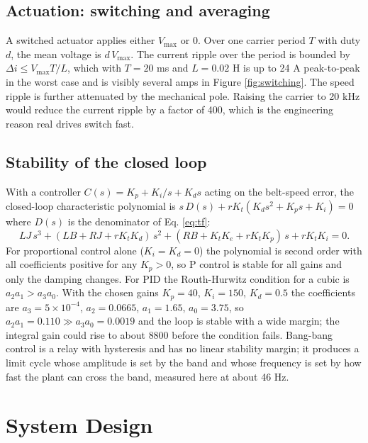 \documentclass[12pt,a4paper]{article}
\begin{document}
\subsection{Actuation: switching and averaging}

A switched actuator applies either $V_{\max}$ or 0. Over one carrier period $T$ with duty $d$, the mean voltage is $d\,V_{\max}$. The current ripple over the period is bounded by $\Delta i \le V_{\max} T / L$, which with $T = 20$ ms and $L = 0.02$ H is up to 24 A peak-to-peak in the worst case and is visibly several amps in Figure \ref{fig:switching}. The speed ripple is further attenuated by the mechanical pole. Raising the carrier to 20 kHz would reduce the current ripple by a factor of 400, which is the engineering reason real drives switch fast.

\subsection{Stability of the closed loop}

With a controller $C(s) = K_p + K_i/s + K_d s$ acting on the belt-speed error, the closed-loop characteristic polynomial is $s\,D(s) + r K_t (K_d s^2 + K_p s + K_i) = 0$ where $D(s)$ is the denominator of Eq. \ref{eq:tf}:
\begin{equation}
L J\,s^3 + (L B + R J + r K_t K_d)\,s^2 + (R B + K_t K_e + r K_t K_p)\,s + r K_t K_i = 0.
\label{eq:char}
\end{equation}
For proportional control alone ($K_i = K_d = 0$) the polynomial is second order with all coefficients positive for any $K_p > 0$, so P control is stable for all gains and only the damping changes. For PID the Routh-Hurwitz condition for a cubic is $a_2 a_1 > a_3 a_0$. With the chosen gains $K_p = 40$, $K_i = 150$, $K_d = 0.5$ the coefficients are $a_3 = 5 \times 10^{-4}$, $a_2 = 0.0665$, $a_1 = 1.65$, $a_0 = 3.75$, so $a_2 a_1 = 0.110 \gg a_3 a_0 = 0.0019$ and the loop is stable with a wide margin; the integral gain could rise to about $8800$ before the condition fails. Bang-bang control is a relay with hysteresis and has no linear stability margin; it produces a limit cycle whose amplitude is set by the band and whose frequency is set by how fast the plant can cross the band, measured here at about 46 Hz.

\section{System Design}
\end{document}
